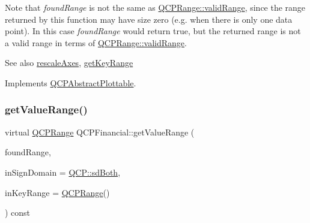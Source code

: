 Note that {\itshape found\+Range} is not the same as \hyperlink{class_q_c_p_range_ab38bd4841c77c7bb86c9eea0f142dcc0}{Q\+C\+P\+Range\+::valid\+Range}, since the range returned by this function may have size zero (e.\+g. when there is only one data point). In this case {\itshape found\+Range} would return true, but the returned range is not a valid range in terms of \hyperlink{class_q_c_p_range_ab38bd4841c77c7bb86c9eea0f142dcc0}{Q\+C\+P\+Range\+::valid\+Range}.

\begin{DoxySeeAlso}{See also}
\hyperlink{class_q_c_p_abstract_plottable_a1491c4a606bccd2d09e65e11b79eb882}{rescale\+Axes}, \hyperlink{class_q_c_p_financial_a15d68fb257113fef697356d65fa76559}{get\+Key\+Range} 
\end{DoxySeeAlso}


Implements \hyperlink{class_q_c_p_abstract_plottable_a4de773988b21ed090fddd27c6a3a3dcb}{Q\+C\+P\+Abstract\+Plottable}.

\mbox{\label{class_q_c_p_financial_ac3ce2b2c76c755078f9a0a4c84802de6}} 
\subsubsection{\texorpdfstring{get\+Value\+Range()}{getValueRange()}\hspace{0.1cm}{\footnotesize\ttfamily [2/2]}}
{\footnotesize\ttfamily virtual \hyperlink{class_q_c_p_range}{Q\+C\+P\+Range} Q\+C\+P\+Financial\+::get\+Value\+Range (\begin{DoxyParamCaption}\item[{bool \&}]{found\+Range,  }\item[{\hyperlink{namespace_q_c_p_afd50e7cf431af385614987d8553ff8a9}{Q\+C\+P\+::\+Sign\+Domain}}]{in\+Sign\+Domain = {\ttfamily \hyperlink{namespace_q_c_p_afd50e7cf431af385614987d8553ff8a9a3dee7e9cd2fedce9253b83e172626a6c}{Q\+C\+P\+::sd\+Both}},  }\item[{const \hyperlink{class_q_c_p_range}{Q\+C\+P\+Range} \&}]{in\+Key\+Range = {\ttfamily \hyperlink{class_q_c_p_range}{Q\+C\+P\+Range}()} }\end{DoxyParamCaption}) const\hspace{0.3cm}{\ttfamily [virtual]}}

